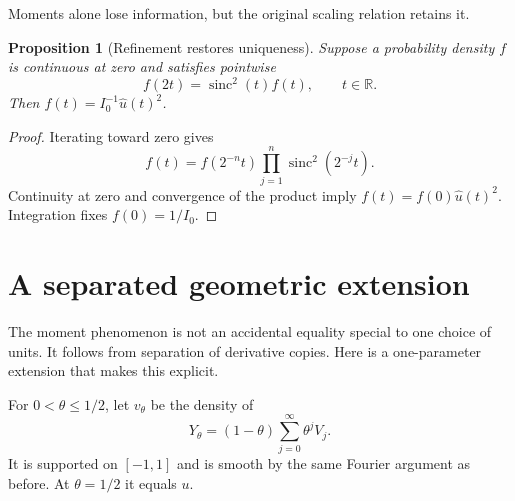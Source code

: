 \documentclass[11pt,a4paper,oneside,openany]{book}
\numberwithin{equation}{chapter}
\newtheorem{proposition}[theorem]{Proposition}
\theoremstyle{definition}
\theoremstyle{remark}
\newcommand{\R}{\mathbb R}
\DeclareMathOperator{\sinc}{sinc}
\begin{document}
Moments alone lose information, but the original scaling relation
retains it.
\begin{proposition}[Refinement restores uniqueness]\label{rs:prop:refinement-unique}
Suppose a probability density $f$ is continuous at zero and satisfies
pointwise
\begin{equation}
 f(2t)=\sinc^2(t)f(t),\qquad t\in\R.
 \label{rs:eq:energy-refinement}
\end{equation}
Then $f(t)=I_0^{-1}\widehat u(t)^2$.
\end{proposition}
\begin{proof}
Iterating toward zero gives
\begin{equation}
 f(t)=f(2^{-n}t)\prod_{j=1}^n\sinc^2(2^{-j}t).
\end{equation}
Continuity at zero and convergence of the product imply
$f(t)=f(0)\widehat u(t)^2$. Integration fixes $f(0)=1/I_0$.
\end{proof}
\chapter{A separated geometric extension}\label{rs:sec:geometric}

The moment phenomenon is not an accidental equality special to one
choice of units. It follows from separation of derivative copies.
Here is a one-parameter extension that makes this explicit.

For $0<\theta\leq1/2$, let $v_\theta$ be the density of
\begin{equation}
 Y_\theta=(1-\theta)\sum_{j=0}^{\infty}\theta^j V_j.
 \label{rs:eq:geometric-series}
\end{equation}
It is supported on $[-1,1]$ and is smooth by the same Fourier
argument as before. At $\theta=1/2$ it equals $u$.
\end{document}
